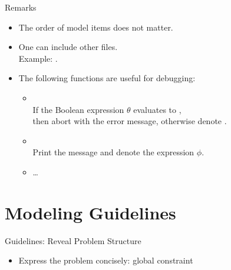 \documentclass{cons-beamer}
\begin{document}
\begin{flashcardminizinc}
\begin{frame}{Remarks}
  \begin{itemize}
  \item The order of model items does not matter. \vfill
  \item One can include other files. \\ Example: . \vfill
  \item The following functions are useful for debugging: \vfill
    \begin{itemize}
    \item {} \\
      If the Boolean expression $\theta$ evaluates to
      , \\ then abort with the error message,
      otherwise denote .  \vfill
    \item {} \\ Print the message
      and denote the expression $\phi$. \vfill
    \item \dots
    \end{itemize}
  \end{itemize}
\end{frame}

\section{Modeling Guidelines}

\begin{frame}{Guidelines: Reveal Problem Structure}
  \begin{itemize}
  \item Express the problem concisely: global constraint


\end{itemize}
\end{frame}
\end{flashcardminizinc}
\end{document}
